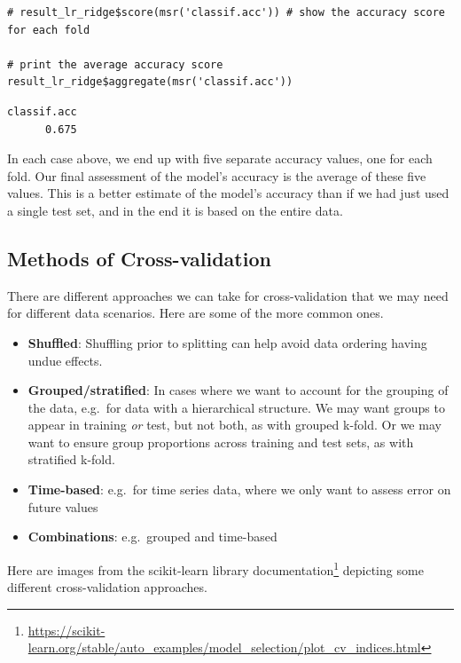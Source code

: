 \documentclass[
  letterpaper,
]{krantz}
\providecommand{\tightlist}{%
  \setlength{\itemsep}{0pt}\setlength{\parskip}{0pt}}\usepackage{longtable,booktabs,array}
\DeclareRobustCommand{\href}[2]{#2\footnote{\url{#1}}}
\begin{document}
\begin{verbatim}
# result_lr_ridge$score(msr('classif.acc')) # show the accuracy score for each fold

# print the average accuracy score
result_lr_ridge$aggregate(msr('classif.acc'))
\end{verbatim}

\begin{verbatim}
classif.acc 
      0.675 
\end{verbatim}

In each case above, we end up with five separate accuracy values, one
for each fold. Our final assessment of the model's accuracy is the
average of these five values. This is a better estimate of the model's
accuracy than if we had just used a single test set, and in the end it
is based on the entire data.

\subsection{Methods of
Cross-validation}\label{methods-of-cross-validation}

There are different approaches we can take for cross-validation that we
may need for different data scenarios. Here are some of the more common
ones.

\begin{itemize}
\tightlist
\item
  \textbf{Shuffled}: Shuffling prior to splitting can help avoid data
  ordering having undue effects.
\item
  \textbf{Grouped/stratified}: In cases where we want to account for the
  grouping of the data, e.g.~for data with a hierarchical structure. We
  may want groups to appear in training \emph{or} test, but not both, as
  with grouped k-fold. Or we may want to ensure group proportions across
  training and test sets, as with stratified k-fold.
\item
  \textbf{Time-based}: e.g.~for time series data, where we only want to
  assess error on future values
\item
  \textbf{Combinations}: e.g.~grouped and time-based
\end{itemize}

Here are images from the
\href{https://scikit-learn.org/stable/auto_examples/model_selection/plot_cv_indices.html}{scikit-learn
library documentation} depicting some different cross-validation
approaches.
\end{document}
